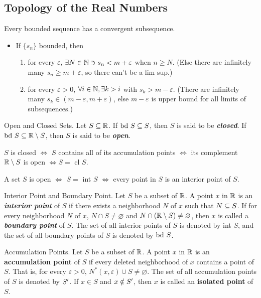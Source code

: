 \documentclass[12pt]{article}
\begin{document}
\subsection{Topology of the Real Numbers}
\label{sec:org719fdb4}
Every bounded sequence has a convergent subsequence.
\begin{itemize}
\item If \(\{s_n\}\) bounded, then
\begin{enumerate}
\item for every \(\varepsilon\), \(\exists N \in \mathbb{N} \ni s_n < m + \varepsilon\) when \(n \ge N\).
(Else there are infinitely many \(s_n \ge m + \varepsilon\), so there can't
be a lim sup.)
\item for every \(\varepsilon > 0\), \(\forall i \in \mathbb{N}, \exists k>i\) with \(s_k > m - \varepsilon\).
(There are infinitely many \(s_k \in (m-\varepsilon, m+\varepsilon)\), else
\(m-\varepsilon\) is upper bound for all limits of subsequences.)
\end{enumerate}
\end{itemize}

\begin{definition}{Open and Closed Sets.}
  Let $S \subseteq \mathbb{R}$. If $\text{bd }S \subseteq S$, then $S$ is said to be
  \textit{\textbf{closed}}. If $\text{bd }S \subseteq \mathbb{R} \setminus S$, then $S$ is
  said to be \textit{\textbf{open}}.

  $S$ is closed $\iff$ $S$ contains all of its accumulation points $\iff$ its
  complement $\mathbb{R} \setminus S$ is open $\iff S =$ cl $S$.

  A set $S$ is open $\iff$ $S =$ int $S$ $\iff$ every point in $S$ is an
  interior point of $S$.
\end{definition}

\begin{definition}{Interior Point and Boundary Point.}
  Let $S$ be a subset of $\mathbb{R}$. A point $x$ in $\mathbb{R}$ is an
  \textit{\textbf{interior point}} of $S$ if there exists a neighborhood $N$
  of $x$ such that $N \subseteq S$. If for every neighborhood $N$ of $x$, $N \cap
  S \ne \varnothing$ and $N \cap (\mathbb{R} \setminus S) \ne \varnothing$, then $x$ is called a
  \textit{\textbf{boundary point}} of $S$. The set of all interior points of
  $S$ is denoted by int $S$, and the set of all boundary points of $S$ is
  denoted by $\text{bd }S$.
\end{definition}

\begin{definition}{Accumulation Points.}
  Let $S$ be a subset of $\mathbb{R}$. A point $x$ in $\mathbb{R}$ is an
  \textbf{accumulation point} of $S$ if every deleted neighborhood of $x$
  contains a point of $S$. That is, for every $\varepsilon > 0$, $N^{*}(x,\varepsilon) \cup S \ne
  \varnothing$. The set of all accumulation points of $S$ is denoted by
  $S'$. If $x\in S$ and $x\notin S'$, then $x$ is called an \textbf{isolated
  point} of $S$.
\end{definition}
\end{document}
